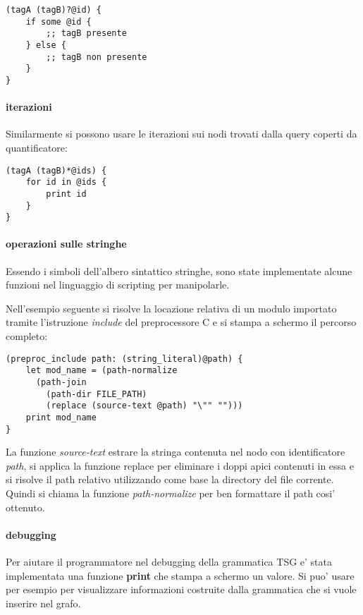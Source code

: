 \begin{Verbatim}[samepage=true]
(tagA (tagB)?@id) {
    if some @id {
        ;; tagB presente
    } else {
        ;; tagB non presente
    }
}
\end{Verbatim}

\paragraph{iterazioni}

Similarmente si possono usare le iterazioni sui nodi trovati dalla query coperti da quantificatore:

\begin{Verbatim}[samepage=true]
(tagA (tagB)*@ids) {
    for id in @ids {
        print id
    }
}
\end{Verbatim}

\paragraph{operazioni sulle stringhe}

Essendo i simboli dell'albero sintattico stringhe, sono state implementate alcune funzioni nel linguaggio di scripting per manipolarle.

Nell'esempio seguente si risolve la locazione relativa di un modulo importato tramite l'istruzione \emph{include} del preprocessore C e si stampa a schermo il percorso completo:

\begin{Verbatim}[samepage=true]
(preproc_include path: (string_literal)@path) {
    let mod_name = (path-normalize
      (path-join
        (path-dir FILE_PATH)
        (replace (source-text @path) "\"" "")))
    print mod_name
}
\end{Verbatim}

La funzione \emph{source-text} estrare la stringa contenuta nel nodo con identificatore \emph{path}, si applica la funzione replace per eliminare i doppi apici contenuti in essa e si risolve il path relativo utilizzando come base la directory del file corrente.
Quindi si chiama la funzione \emph{path-normalize} per ben formattare il path cosi' ottenuto.

\paragraph{debugging}

Per aiutare il programmatore nel debugging della grammatica TSG e' stata implementata una funzione \textbf{print} che stampa a schermo un valore.
Si puo' usare per esempio per visualizzare informazioni costruite dalla grammatica che si vuole inserire nel grafo.

